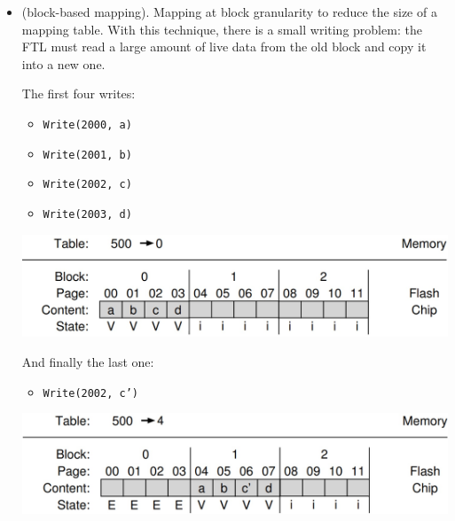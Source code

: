 \begin{itemize}
    \item {} (block-based mapping). Mapping at block granularity to reduce the size of a mapping table. With this technique, there is a small writing problem: the FTL must read a large amount of live data from the old block and copy it into a new one.
    \begin{examplebox}
        The first four writes:
        \begin{multicols}{2}
            \begin{itemize}
                \item \texttt{Write(2000, a)}
                \item \texttt{Write(2001, b)}
                \item \texttt{Write(2002, c)}
                \item \texttt{Write(2003, d)}
            \end{itemize}
        \end{multicols}
        \begin{center}
            \includegraphics[width=\textwidth]{img/block-mapping-1.png}
        \end{center}

        \noindent
        And finally the last one:
        \begin{itemize}
            \item \texttt{Write(2002, c')}
        \end{itemize}
        \begin{center}
            \includegraphics[width=\textwidth]{img/block-mapping-2.png}
        \end{center}
    \end{examplebox}
    

\end{itemize}
